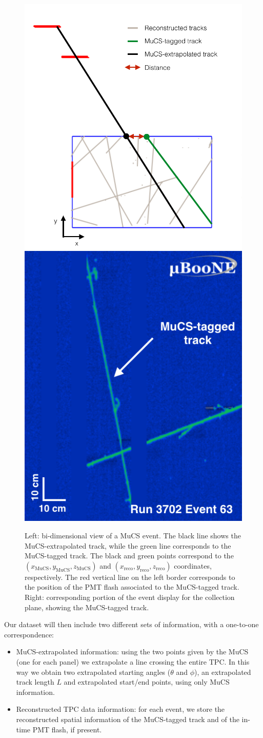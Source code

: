 \documentclass[a4paper]{scrartcl}
\begin{document}
\begin{figure}[htbp]
  \begin{center}
  \includegraphics[width=0.50\linewidth]{figures/evd.pdf}  \vspace{1.8em}\includegraphics[width=0.40\linewidth]{figures/evd_display.png}

  \caption{Left: bi-dimensional view of a MuCS event. The black line shows the MuCS-extrapolated track, while the green line corresponds to the MuCS-tagged track. The black and green points correspond to the $(x_{\mathrm{MuCS}},y_{\mathrm{MuCS}},z_{\mathrm{MuCS}})$ and $(x_{\mathrm{reco}},y_{\mathrm{reco}},z_{\mathrm{reco}})$ coordinates, respectively. The red vertical line on the left border corresponds to the position of the PMT flash associated to the MuCS-tagged track. Right: corresponding portion of the event display for the collection plane, showing the MuCS-tagged track.} \label{fig:evd}
\end{center}
\end{figure}

Our dataset will then include two different sets of information, with a one-to-one correspondence:
\begin{itemize}
  \item MuCS-extrapolated information: using the two points given by the MuCS (one for each panel) we extrapolate a line crossing the entire TPC. In this way we obtain two extrapolated starting angles ($\theta$ and $\phi$), an extrapolated track length $L$ and extrapolated start/end points, using only MuCS information.
  \item Reconstructed TPC data information: for each event, we store the reconstructed spatial information of the MuCS-tagged track and of the in-time PMT flash, if present.
\end{itemize}
\end{document}
